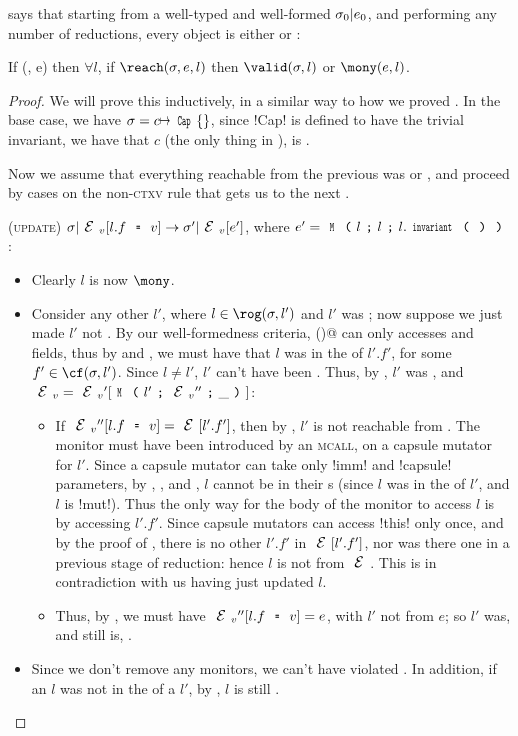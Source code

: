  says that starting from a well-typed and well-formed $\sigma_0|e_0$, and performing any number of reductions, every \reach object is either \valid or \mony:%
\SS\begin{theorem}\rm
If \VS(\s, e) then $\forall l$, if $\reach(\s, e, l)$ then $\valid(\s, l)$ or $\mony(e, l)$.
\end{theorem}\SS
\begin{proof}
We will prove this inductively, in a similar way to how we proved .
In the base case, we have $\s = c\mapsto\Kw{Cap}\{\}$, since \Q!Cap! is defined to have the trivial invariant, we have that $c$ (the only thing in \s), is \valid.

Now we assume that everything reachable from the previous \VS was \valid or \mony, and proceed by cases on the non-\textsc{ctxv} rule that gets us to the next \VS.
\begin{ienumerate}

	\item (\textsc{update}) $\s|\EV[l.f\equals v]\rightarrow \s'|\EV[e']$, where  $e'=\M{l}{l}{l.\invariant}$:
	\begin{itemize}
		\item Clearly $l$ is now $\mony$.
		\item Consider any other $l'$, where $l \in \rog(\s,l')$ and $l'$ was \valid; now suppose we just made $l'$ not \valid. By our well-formedness criteria, \Q@invariant()@ can only accesses \Q@imm@ and \Q@capsule@ fields, thus by  and , we must have that $l$ was in the \rog of $l'.f'$, for some $f' \in \cf(\s, l')$. Since $l \neq l'$, $l'$ can't have been \WE. Thus, by , $l'$ was \HNO, and $\EV = \EV'[\M{l'}{\EV''}{\_}]$:
		\begin{itemize}
			\item If $\EV''[l.f \equals v] = \E[l'.f']$, then by \HNO, $l'$ is not reachable from \E. The monitor must have been introduced by an \textsc{mcall}, on a capsule mutator for $l'$. Since a capsule mutator can take only \Q!imm! and \Q!capsule! parameters, by , , and , $l$ cannot be in their \rog{}s (since $l$ was in the \rog of $l'$, and $l$ is \Q!mut!). Thus the only way for the body of the monitor to access $l$ is by accessing $l'.f'$.
			Since capsule mutators can access \Q!this! only once, and by the proof of , there is no other $l'.f'$ in $\E[l'.f']$, nor was there one in a previous stage of reduction: hence $l$ is not \reach from $\E$. This is in contradiction with us having just updated $l$.
			\item Thus, by \HNO, we must have $\EV''[l.f \equals v] = e$, with $l'$ not \reach from $e$; so $l'$ was, and still is, \mony.
		\end{itemize}
		\item Since we don't remove any monitors, we can't have violated \mony. In addition, if an $l$ was not in the \rog of a \valid $l'$, by , $l$ is still \valid.
	\end{itemize}


\end{ienumerate}
\end{proof}
